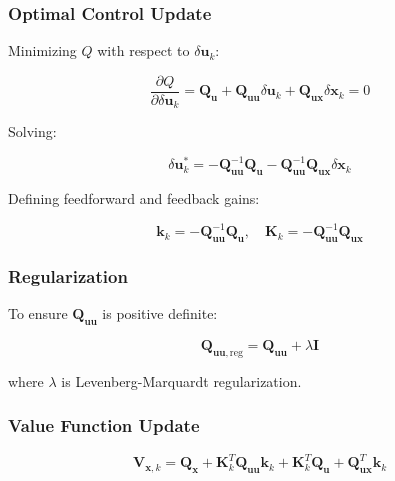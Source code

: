\documentclass[11pt,a4paper]{article}
\begin{document}
\subsubsection{Optimal Control Update}

Minimizing $Q$ with respect to $\delta \mathbf{u}_k$:

\begin{equation}
\frac{\partial Q}{\partial \delta \mathbf{u}_k} = \mathbf{Q}_{\mathbf{u}} + \mathbf{Q}_{\mathbf{uu}} \delta \mathbf{u}_k + \mathbf{Q}_{\mathbf{ux}} \delta \mathbf{x}_k = 0
\end{equation}

Solving:

\begin{equation}
\delta \mathbf{u}_k^* = -\mathbf{Q}_{\mathbf{uu}}^{-1} \mathbf{Q}_{\mathbf{u}} - \mathbf{Q}_{\mathbf{uu}}^{-1} \mathbf{Q}_{\mathbf{ux}} \delta \mathbf{x}_k
\end{equation}

Defining feedforward and feedback gains:

\begin{equation}
\mathbf{k}_k = -\mathbf{Q}_{\mathbf{uu}}^{-1} \mathbf{Q}_{\mathbf{u}}, \quad \mathbf{K}_k = -\mathbf{Q}_{\mathbf{uu}}^{-1} \mathbf{Q}_{\mathbf{ux}}
\end{equation}

\subsubsection{Regularization}

To ensure $\mathbf{Q}_{\mathbf{uu}}$ is positive definite:

\begin{equation}
\mathbf{Q}_{\mathbf{uu},\text{reg}} = \mathbf{Q}_{\mathbf{uu}} + \lambda \mathbf{I}
\end{equation}

where $\lambda$ is Levenberg-Marquardt regularization.

\subsubsection{Value Function Update}

\begin{equation}
\mathbf{V}_{\mathbf{x},k} = \mathbf{Q}_{\mathbf{x}} + \mathbf{K}_k^T \mathbf{Q}_{\mathbf{uu}} \mathbf{k}_k + \mathbf{K}_k^T \mathbf{Q}_{\mathbf{u}} + \mathbf{Q}_{\mathbf{ux}}^T \mathbf{k}_k
\end{equation}
\end{document}
